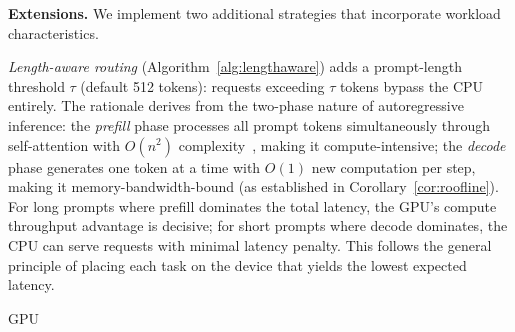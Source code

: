 \documentclass[10pt,conference]{IEEEtran}
\begin{document}
\textbf{Extensions.}
We implement two additional strategies that incorporate workload characteristics.

\emph{Length-aware routing} (Algorithm~\ref{alg:lengthaware}) adds a prompt-length threshold $\tau$ (default 512 tokens): requests exceeding $\tau$ tokens bypass the CPU entirely.
The rationale derives from the two-phase nature of autoregressive inference: the \emph{prefill} phase processes all prompt tokens simultaneously through self-attention with $O(n^2)$ complexity~\cite{vaswani2017attention}, making it compute-intensive; the \emph{decode} phase generates one token at a time with $O(1)$ new computation per step, making it memory-bandwidth-bound (as established in Corollary~\ref{cor:roofline}).
For long prompts where prefill dominates the total latency, the GPU's compute throughput advantage is decisive; for short prompts where decode dominates, the CPU can serve requests with minimal latency penalty.
This follows the general principle of placing each task on the device that yields the lowest expected latency.

\begin{algorithm}[t]
\DontPrintSemicolon
\SetAlgoLined
\caption{CapacityAwareRouter --- Length-Aware Strategy}
\label{alg:lengthaware}
\Return GPU\;
\end{algorithm}
\end{document}
